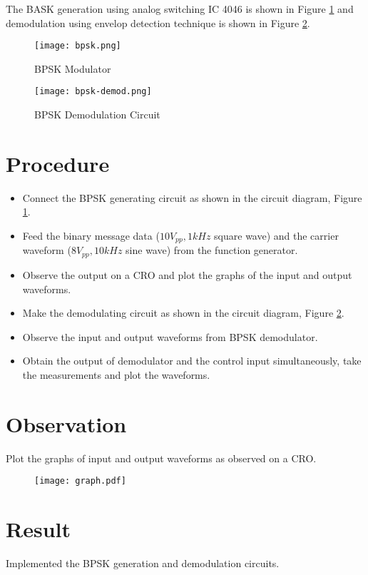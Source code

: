 The BASK generation using analog switching IC 4046 is shown in Figure \ref{bpsk-gen} and demodulation using envelop detection technique is shown in Figure \ref{bpsk-det}.

\begin{figure}[h]
	\texttt{[image: bpsk.png]}
	\caption{BPSK Modulator}
	\label{bpsk-gen}
\end{figure}

\begin{figure}
	\texttt{[image: bpsk-demod.png]}
	\caption{BPSK Demodulation Circuit}
	\label{bpsk-det}
\end{figure}

\clearpage
\section*{Procedure}
\begin{itemize}
\item
Connect the BPSK generating circuit as shown in the circuit diagram, Figure \ref{bpsk-gen}.
\item
Feed the binary message data ($10 V_{pp}, 1 kHz$ square wave) and the carrier waveform  ($8 V_{pp}, 10 kHz$ sine wave) from the function generator.
\item
Observe the output on a CRO and plot the graphs of the input and output waveforms.
\item
Make the demodulating circuit as shown in the circuit diagram, Figure \ref{bpsk-det}.
\item
Observe the input and output waveforms from BPSK demodulator.
\item 
Obtain the output of demodulator and the control input simultaneously, take the measurements and plot the waveforms.

\end{itemize}
\section*{Observation}
Plot the graphs of input and output waveforms as observed on a CRO.

\begin{figure}
	\texttt{[image: graph.pdf]}
\end{figure}

\section*{Result}

Implemented the BPSK generation and demodulation circuits.